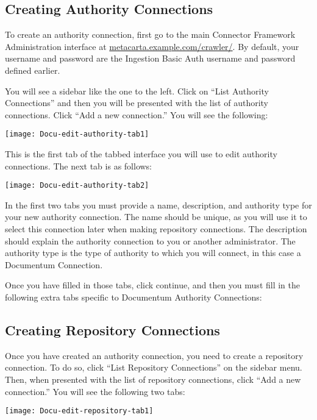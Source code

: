 \begin{changemargin}{1.5in}{0in}
\subsection{Creating Authority Connections}

To create an authority connection, first go to the
main Connector Framework Administration interface at
\url{metacarta.example.com/crawler/}.  By default, your username and
password are the Ingestion Basic Auth username and password defined
earlier. 

You will see a sidebar like the one to the left. Click on ``List
Authority Connections'' and then you will be presented with the
list of authority connections. Click ``Add a new connection.''
You will see the following:



\texttt{[image: Docu-edit-authority-tab1]}

This is the first tab of the tabbed interface you will use to edit
authority connections. The next tab is as follows:

\texttt{[image: Docu-edit-authority-tab2]}

In the first two tabs you must provide a name, description, and
authority type for your new authority connection. The name should be
unique, as you will use it to select this connection later when making
repository connections. The description should explain the authority
connection to you or another administrator. The authority type is the
type of authority to which you will connect, in this case a Documentum
Connection.

Once you have filled in those tabs, click continue, and then you must
fill in the following extra tabs specific to Documentum Authority
Connections:



\subsection{Creating Repository Connections}

Once you have created an authority connection, you need to create a
repository connection.
To do so, click ``List Repository Connections'' on the sidebar menu. Then,
when presented with the list of repository connections, click ``Add a
new connection.'' You will see the following two tabs:

\texttt{[image: Docu-edit-repository-tab1]}


\end{changemargin}
